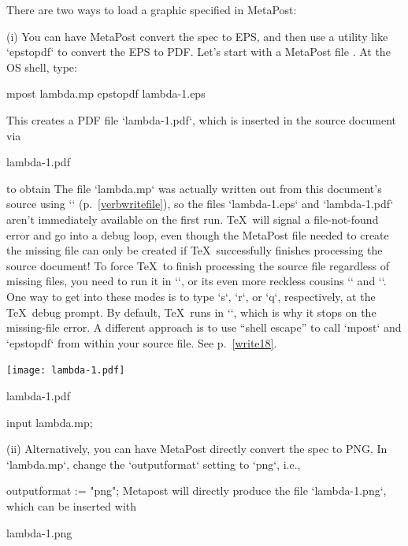 {{{{{{{{{There are two ways to load a graphic specified in MetaPost:

(i) You can have MetaPost convert the spec to EPS, and
then use a utility like `epstopdf` to convert the EPS to PDF.
Let’s start with a MetaPost file
. At the OS shell, type:

\begintt
mpost lambda.mp
epstopdf lambda-1.eps
\endtt

This creates a PDF file `lambda-1.pdf`, which is inserted in
the source document via

\begintt
\centerline{\XeTeXpdffile lambda-1.pdf }
\endtt
to obtain\f{%
%
The file
`lambda.mp` was actually written out from this document’s
source using `\verbwrite` (p.~\ref{verbwritefile}),
so the files `lambda-1.eps` and `lambda-1.pdf` aren’t immediately available
on the first run. \TeX\ will signal a file-not-found error and go
into a debug loop, even though the MetaPost file needed to create
the missing file can only be created if \TeX\ successfully
finishes processing the source document! To force \TeX\ to finish
processing the source file regardless of missing files, you need
to run it in
`\scrollmode`, or its even more reckless cousins
`\nonstopmode` and `\batchmode`.  One way to get into
these modes is to type `s`, `r`, or `q`,
respectively, at the \TeX\ debug prompt.  By default, \TeX\
runs in `\errorstopmode`, which is why it stops on
the missing-file error. A different approach is to use “shell
escape” to call `mpost` and `epstopdf` from within your
source file. See p.~\ref{write18}.}


\ifx\directlua\UnDeFiNeD
\ifx\XeTeXversion\UnDeFiNeD
\centerline{\texttt{[image: lambda-1.pdf]}}
\else
\centerline{\XeTeXpdffile lambda-1.pdf }
\fi
\else
\centerline{%
  \mplibcode
  input lambda.mp;
  \endmplibcode
  }%
\fi

(ii) Alternatively, you can have MetaPost directly convert
the spec to
PNG. In `lambda.mp`, change the `outputformat` setting to `png`,
i.e.,

\begintt
outputformat := "png";
\endtt
Metapost will directly produce the file `lambda-1.png`, which
can be inserted with

\begintt
\XeTeXpicfile lambda-1.png
\endtt

}}}}}}}}}
